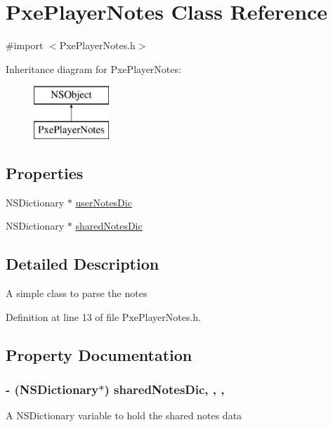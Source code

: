 \hypertarget{interface_pxe_player_notes}{\section{Pxe\-Player\-Notes Class Reference}
\label{interface_pxe_player_notes}
}


{\ttfamily \#import $<$Pxe\-Player\-Notes.\-h$>$}

Inheritance diagram for Pxe\-Player\-Notes\-:\begin{figure}[H]
\begin{center}
\leavevmode
\includegraphics[height=2.000000cm]{interface_pxe_player_notes}
\end{center}
\end{figure}
\subsection*{Properties}
\begin{DoxyCompactItemize}
\item 
N\-S\-Dictionary $\ast$ \hyperlink{interface_pxe_player_notes_a8c454cc9d07d5e77e226f9eb29728a91}{user\-Notes\-Dic}
\item 
N\-S\-Dictionary $\ast$ \hyperlink{interface_pxe_player_notes_a109ae37b63155e90c8a267fe386ea131}{shared\-Notes\-Dic}
\end{DoxyCompactItemize}


\subsection{Detailed Description}
A simple class to parse the notes 

Definition at line 13 of file Pxe\-Player\-Notes.\-h.



\subsection{Property Documentation}
\hypertarget{interface_pxe_player_notes_a109ae37b63155e90c8a267fe386ea131}{
\subsubsection[{shared\-Notes\-Dic}]{\setlength{\rightskip}{0pt plus 5cm}-\/ (N\-S\-Dictionary$\ast$) shared\-Notes\-Dic\hspace{0.3cm}{\ttfamily [read]}, {\ttfamily [write]}, {\ttfamily [nonatomic]}, {\ttfamily [strong]}}}\label{interface_pxe_player_notes_a109ae37b63155e90c8a267fe386ea131}
A N\-S\-Dictionary variable to hold the shared notes data 

